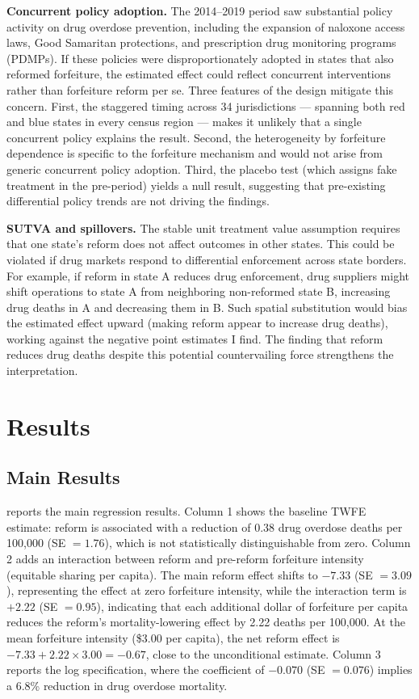 \documentclass[12pt]{article}
\begin{document}
\textbf{Concurrent policy adoption.} The 2014--2019 period saw substantial policy activity on drug overdose prevention, including the expansion of naloxone access laws, Good Samaritan protections, and prescription drug monitoring programs (PDMPs). If these policies were disproportionately adopted in states that also reformed forfeiture, the estimated effect could reflect concurrent interventions rather than forfeiture reform per se. Three features of the design mitigate this concern. First, the staggered timing across 34 jurisdictions --- spanning both red and blue states in every census region --- makes it unlikely that a single concurrent policy explains the result. Second, the heterogeneity by forfeiture dependence is specific to the forfeiture mechanism and would not arise from generic concurrent policy adoption. Third, the placebo test (which assigns fake treatment in the pre-period) yields a null result, suggesting that pre-existing differential policy trends are not driving the findings.

\textbf{SUTVA and spillovers.} The stable unit treatment value assumption requires that one state's reform does not affect outcomes in other states. This could be violated if drug markets respond to differential enforcement across state borders. For example, if reform in state A reduces drug enforcement, drug suppliers might shift operations to state A from neighboring non-reformed state B, increasing drug deaths in A and decreasing them in B. Such spatial substitution would bias the estimated effect upward (making reform appear to increase drug deaths), working against the negative point estimates I find. The finding that reform reduces drug deaths despite this potential countervailing force strengthens the interpretation.


\section{Results}
\label{sec:results}

\subsection{Main Results}

 reports the main regression results. Column 1 shows the baseline TWFE estimate: reform is associated with a reduction of 0.38 drug overdose deaths per 100,000 (SE $= 1.76$), which is not statistically distinguishable from zero. Column 2 adds an interaction between reform and pre-reform forfeiture intensity (equitable sharing per capita). The main reform effect shifts to $-7.33$ (SE $= 3.09$), representing the effect at zero forfeiture intensity, while the interaction term is $+2.22$ (SE $= 0.95$), indicating that each additional dollar of forfeiture per capita reduces the reform's mortality-lowering effect by 2.22 deaths per 100,000. At the mean forfeiture intensity (\$3.00 per capita), the net reform effect is $-7.33 + 2.22 \times 3.00 = -0.67$, close to the unconditional estimate. Column 3 reports the log specification, where the coefficient of $-0.070$ (SE $= 0.076$) implies a 6.8\% reduction in drug overdose mortality.
\end{document}
